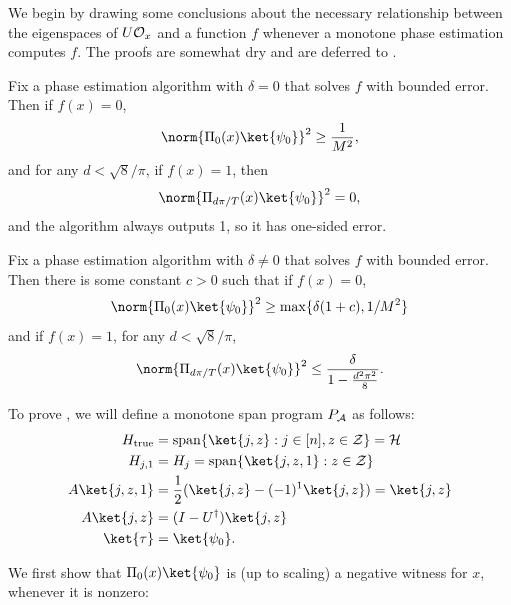 \documentclass{toc}
\begin{document}
We begin by drawing some conclusions about the necessary relationship between the eigenspaces of $U{\cal O}_x$ and a function $f$ whenever a monotone phase estimation computes $f$. The proofs are somewhat dry and are deferred to . %

\begin{lemma}\label{lem:phase-est-alg-delta-zero}
Fix a phase estimation algorithm with $\delta=0$ that solves $f$ with bounded error. Then if $f(x)=0$,
$$\norm{\Pi_0(x)\ket{\psi_0}}^2\geq \frac{1}{M^2},$$
and for any $d<\sqrt{8}/\pi$, if $f(x)=1$, then
$$\norm{\Pi_{d\pi/T}(x)\ket{\psi_0}}^2=0,$$
and the algorithm always outputs 1, so it has one-sided error.
\end{lemma}

\begin{lemma}\label{lem:phase-est-alg}
Fix a phase estimation algorithm with $\delta\neq 0$ that solves $f$ with bounded error. Then there is some constant $c>0$ such that if $f(x)=0$,
$$\norm{\Pi_0(x)\ket{\psi_0}}^2 \geq \max\{\delta(1+c),1/M^2\}$$
and if $f(x)=1$, for any $d<\sqrt{8}/\pi$, 
$$\norm{\Pi_{d\pi/T}(x)\ket{\psi_0}}^2 \leq \frac{\delta}{1-\frac{d^2\pi^2}{8}}.$$
\end{lemma}


To prove , we will define a monotone span program $P_{\cal A}$ as follows:
\begin{align}
H_{\mathrm{true}} &=\mathrm{span}\{\ket{j,z}:j\in [n],z\in{\cal Z}\}={\cal H}\nonumber\\
H_{j,1} &=H_j=\mathrm{span}\{\ket{j,z,1}:z\in{\cal Z}\}\nonumber\\
A\ket{j,z,1} &= \frac{1}{2}(\ket{j,z}-(-1)^1\ket{j,z}) = \ket{j,z}\nonumber\\
A\ket{j,z} &=(I-U^\dagger)\ket{j,z}\nonumber\\
\ket{\tau} &=\ket{\psi_0}.\label{eq:monotone-span}
\end{align}

We first show that $\Pi_0(x)\ket{\psi_0}$ is (up to scaling) a negative witness for $x$, whenever it is nonzero:
\end{document}
